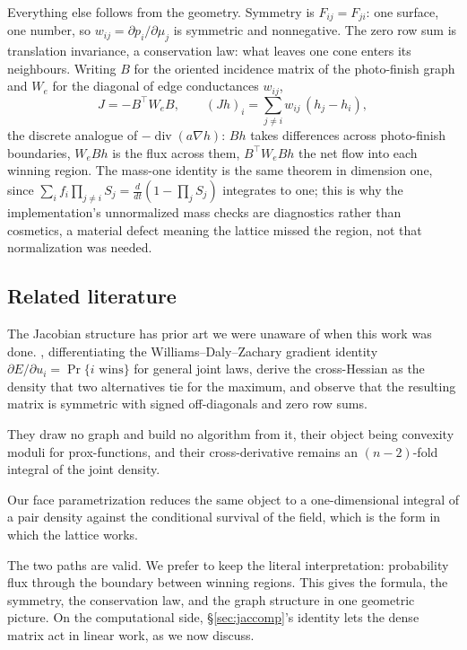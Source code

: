 \documentclass[11pt]{article}
\begin{document}
Everything else follows from the geometry. Symmetry is $F_{ij}=F_{ji}$:
one surface, one number, so $w_{ij}=\partial p_i/\partial\mu_j$ is
symmetric and nonnegative. The zero row sum is translation invariance, a
conservation law: what leaves one cone enters its neighbours. Writing $B$
for the oriented incidence matrix of the photo-finish graph and $W_e$ for
the diagonal of edge conductances $w_{ij}$,
\[
   J=-B^{\top}W_eB,
   \qquad
   (Jh)_i=\sum_{j\ne i}w_{ij}\,(h_j-h_i),
\]
the discrete analogue of $-\operatorname{div}(a\nabla h)$: $Bh$ takes
differences across photo-finish boundaries, $W_eBh$ is the flux across
them, $B^{\top}W_eBh$ the net flow into each winning region. The
mass-one identity is the same theorem in dimension one, since
$\sum_i f_i\prod_{j\ne i}S_j = \tfrac{d}{dt}(1-\prod_j S_j)$
integrates to one; this is why the implementation's unnormalized mass
checks are diagnostics rather than cosmetics, a material defect meaning
the lattice missed the region, not that normalization was needed.

\subsection{Related literature}

The Jacobian structure has prior art we were unaware of when this work was done.
\citet{muller2022}, differentiating the Williams--Daly--Zachary
gradient identity $\partial E/\partial u_i=\Pr\{i \text{ wins}\}$ for
general joint laws, derive the cross-Hessian as the density that two
alternatives tie for the maximum, and observe that the resulting matrix
is symmetric with signed off-diagonals and zero row sums.

They draw no graph and build no
algorithm from it, their object being convexity moduli for
prox-functions, and their cross-derivative remains an $(n-2)$-fold
integral of the joint density.

Our face parametrization reduces
the same object to a one-dimensional integral of a pair density against
the conditional survival of the field, which is the form in which the lattice works.

The two paths are valid. We prefer to keep the literal interpretation: probability
flux through the boundary between winning regions. This gives the formula, the symmetry, the conservation law, and the graph structure in one geometric picture. On the computational
side, \S\ref{sec:jaccomp}'s identity lets the dense matrix act in
linear work, as we now discuss.
\end{document}

